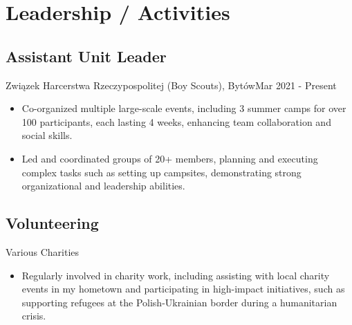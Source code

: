\section{Leadership / Activities}
\subsection{Assistant Unit Leader}{Związek Harcerstwa Rzeczypospolitej (Boy Scouts), Bytów}{Mar 2021 - Present}
\begin{itemize}
    \item Co-organized multiple large-scale events, including 3 summer camps for over 100 participants, each lasting 4 weeks, enhancing team collaboration and social skills.
    \item Led and coordinated groups of 20+ members, planning and executing complex tasks such as setting up campsites, demonstrating strong organizational and leadership abilities.
\end{itemize}

\subsection{Volunteering}{Various Charities}{}
\begin{itemize}
    \item Regularly involved in charity work, including assisting with local charity events in my hometown and participating in high-impact initiatives, such as supporting refugees at the Polish-Ukrainian border during a humanitarian crisis.
\end{itemize}

\vspace{1em}
